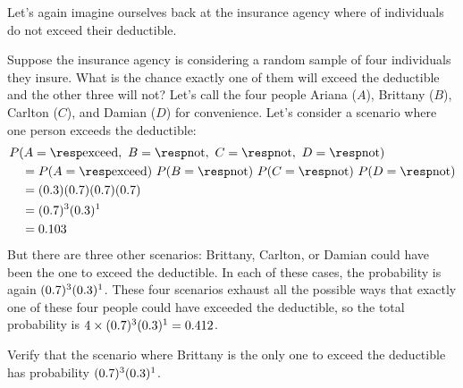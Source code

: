 \noindent%
Let's again imagine ourselves back at the insurance agency
where \insureSperc{} of individuals do not exceed their
deductible.

\begin{examplewrap}
\begin{nexample}{Suppose the insurance agency is considering
    a random sample of four individuals they insure.
    What is the chance exactly one of them will exceed
    the deductible and the other three will not?
    Let's call the four people
    Ariana ($A$),
    Brittany ($B$),
    Carlton ($C$),
    and Damian ($D$)
    for convenience.}
  \label{insureOneOfFourExceedsDeductible}%
  Let's consider a scenario where one person exceeds
  the deductible:
  \begin{align*}
  &P(A=\text{\insureF{}},
      \text{ }B=\text{\insureS{}},
      \text{ }C=\text{\insureS{}},
      \text{ }D=\text{\insureS{}}) \\
    &\quad = P(A=\text{\insureF{}})\ 
        P(B=\text{\insureS{}})\ 
        P(C=\text{\insureS{}})\ 
        P(D=\text{\insureS{}}) \\
    &\quad =  (\insureFprob{})
        (\insureSprob{})
        (\insureSprob{})
        (\insureSprob{}) \\
    &\quad = (\insureSprob{})^3 (\insureFprob{})^1 \\
    &\quad = \insureBinomCinDSingleScenario{}
  \end{align*}
  But there are three other scenarios: Brittany, Carlton,
  or Damian could have been the one to exceed the deductible.
  In each of these cases, the probability is again
  $(0.7{})^3 (0.3{})^1$.
  These four scenarios exhaust all the possible ways that
  exactly one of these four people could have exceeded
  the deductible, so the total probability is
  $4 \times (0.7{})^3 (0.3{})^1
      = 0.412{}$.
\end{nexample}
\end{examplewrap}

\begin{exercisewrap}
\begin{nexercise}
Verify that the scenario where Brittany is the only one
to exceed the deductible has probability
$(0.7{})^3 (0.3{})^1$.~\footnotemark{}
\end{nexercise}
\end{exercisewrap}


